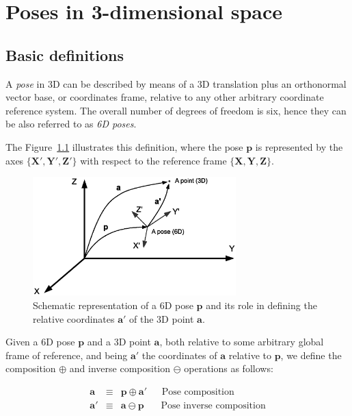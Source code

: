 \documentclass[a4paper,10pt]{report}
\begin{document}
\chapter{Poses in 3-dimensional space}


\section{Basic definitions}
\label{sect:basic}

A \emph{pose} in 3D can be described by means of a 3D translation plus an orthonormal vector base, 
or coordinates frame, relative to any other arbitrary coordinate reference system. 
The overall number of degrees of freedom is six, hence they can be also referred 
to as \emph{6D poses}.


The Figure~\ref{fig:1} illustrates this definition, where the pose $\mathbf{p}$ is represented
by the axes $\{\mathbf{X}',\mathbf{Y}',\mathbf{Z}' \}$ with respect to the reference frame 
$\{\mathbf{X},\mathbf{Y},\mathbf{Z} \}$.


\begin{figure}[h!]
\centering
\includegraphics[width=0.70\textwidth]{fig_pose_composition.eps}
\caption{Schematic representation of a 6D pose $\mathbf{p}$ and its role in defining 
the relative coordinates $\mathbf{a}'$ of the 3D point $\mathbf{a}$.}
\label{fig:1}
\end{figure}


Given a 6D pose $\mathbf{p}$ and a 3D point $\mathbf{a}$, both relative to some arbitrary
global frame of reference, and being $\mathbf{a}'$ the coordinates of $\mathbf{a}$ relative
to $\mathbf{p}$, we define 
the composition $\oplus$ and inverse composition $\ominus$ operations as follows:

\begin{eqnarray*}
\mathbf{a} & \equiv & \mathbf{p} \oplus \mathbf{a}'   ~~~~~~~ \textrm{Pose composition} \\
\mathbf{a'} & \equiv & \mathbf{a} \ominus \mathbf{p}  ~~~~~~~~ \textrm{Pose inverse composition} \\
\end{eqnarray*}
\end{document}
